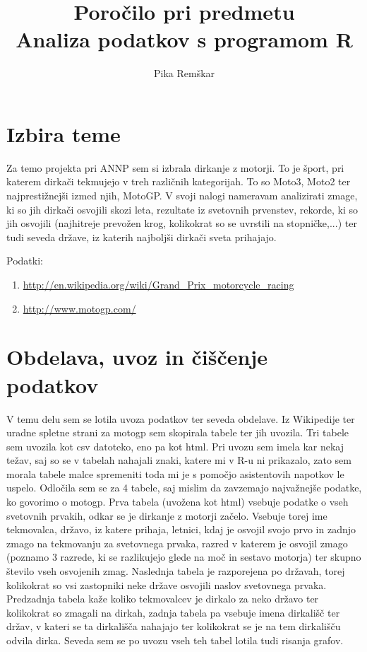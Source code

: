 \documentclass[11pt,a4paper]{article}
\begin{document}
\title{Poročilo pri predmetu \\
Analiza podatkov s programom R}
\author{Pika Remškar}
\maketitle

\section{Izbira teme}

Za temo projekta pri ANNP sem si izbrala dirkanje z motorji. To je šport, pri katerem dirkači tekmujejo v treh različnih kategorijah. To so Moto3, Moto2 ter najprestižnejši izmed njih, MotoGP. V svoji nalogi nameravam analizirati zmage, ki so jih dirkači osvojili skozi leta, rezultate iz svetovnih prvenstev, rekorde, ki so jih osvojili (najhitreje prevožen krog, kolikokrat so se uvrstili na stopničke,...) ter tudi seveda države, iz katerih najboljši dirkači sveta prihajajo. 

Podatki: 
\begin{enumerate}
\item \url{http://en.wikipedia.org/wiki/Grand_Prix_motorcycle_racing}
\item \url{http://www.motogp.com/}
\end{enumerate}

\section{Obdelava, uvoz in čiščenje podatkov}

V temu delu sem se lotila uvoza podatkov ter seveda obdelave. Iz Wikipedije ter uradne spletne strani za motogp sem skopirala tabele ter jih uvozila. Tri tabele sem uvozila kot csv datoteko, eno pa kot html. Pri uvozu sem imela kar nekaj težav, saj so se v tabelah nahajali znaki, katere mi v R-u ni prikazalo, zato sem morala tabele malce spremeniti toda mi je s pomočjo asistentovih napotkov le uspelo. Odločila sem se za 4 tabele, saj mislim da zavzemajo najvažnejše podatke, ko govorimo o motogp. 
Prva tabela (uvožena kot html) vsebuje podatke o vseh svetovnih prvakih, odkar se je dirkanje z motorji začelo. Vsebuje torej ime tekmovalca, državo, iz katere prihaja, letnici, kdaj je osvojil svojo prvo in zadnjo zmago na tekmovanju za svetovnega prvaka, razred v katerem je osvojil zmago (poznamo 3 razrede, ki se razlikujejo glede na moč in sestavo motorja) ter skupno število vseh osvojenih zmag. 
Naslednja tabela je razporejena po državah, torej kolikokrat so vsi zastopniki neke države osvojili naslov svetovnega prvaka. 
Predzadnja tabela kaže koliko tekmovalcev je dirkalo za neko državo ter kolikokrat so zmagali na dirkah, zadnja tabela pa vsebuje imena dirkališč ter držav, v kateri se ta dirkališča nahajajo ter kolikokrat se je na tem dirkališču odvila dirka. Seveda sem se po uvozu vseh teh tabel lotila tudi risanja grafov. 
\end{document}
